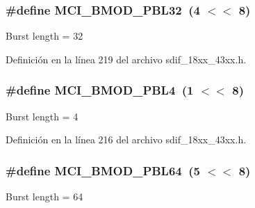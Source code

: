 \subsubsection[{\texorpdfstring{M\+C\+I\+\_\+\+B\+M\+O\+D\+\_\+\+P\+B\+L32}{MCI_BMOD_PBL32}}]{\setlength{\rightskip}{0pt plus 5cm}\#define M\+C\+I\+\_\+\+B\+M\+O\+D\+\_\+\+P\+B\+L32~(4 $<$$<$ 8)}\hypertarget{group___s_d_i_f__18_x_x__43_x_x_ga7138b5088faac16f9a452de8911bab78}{}\label{group___s_d_i_f__18_x_x__43_x_x_ga7138b5088faac16f9a452de8911bab78}
Burst length = 32 

Definición en la línea 219 del archivo sdif\+\_\+18xx\+\_\+43xx.\+h.

\subsubsection[{\texorpdfstring{M\+C\+I\+\_\+\+B\+M\+O\+D\+\_\+\+P\+B\+L4}{MCI_BMOD_PBL4}}]{\setlength{\rightskip}{0pt plus 5cm}\#define M\+C\+I\+\_\+\+B\+M\+O\+D\+\_\+\+P\+B\+L4~(1 $<$$<$ 8)}\hypertarget{group___s_d_i_f__18_x_x__43_x_x_ga30bd9f27c3dc69cb6ce5b9998e4d3ac1}{}\label{group___s_d_i_f__18_x_x__43_x_x_ga30bd9f27c3dc69cb6ce5b9998e4d3ac1}
Burst length = 4 

Definición en la línea 216 del archivo sdif\+\_\+18xx\+\_\+43xx.\+h.

\subsubsection[{\texorpdfstring{M\+C\+I\+\_\+\+B\+M\+O\+D\+\_\+\+P\+B\+L64}{MCI_BMOD_PBL64}}]{\setlength{\rightskip}{0pt plus 5cm}\#define M\+C\+I\+\_\+\+B\+M\+O\+D\+\_\+\+P\+B\+L64~(5 $<$$<$ 8)}\hypertarget{group___s_d_i_f__18_x_x__43_x_x_ga0daf92f643fda0dc70f15d9dffdf5fff}{}\label{group___s_d_i_f__18_x_x__43_x_x_ga0daf92f643fda0dc70f15d9dffdf5fff}
Burst length = 64 

